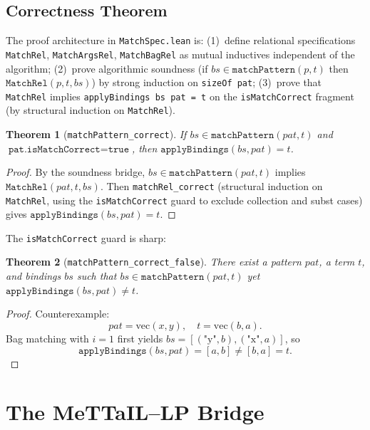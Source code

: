 \documentclass[]{article}
\newtheorem{theorem}{Theorem}
\newcommand{\code}[1]{\texttt{#1}}
\newcommand{\MeTTaIL}{\textup{MeTTaIL}}
\begin{document}
\subsection{Correctness Theorem}

The proof architecture in \code{MatchSpec.lean} is:
(1)~define relational specifications \code{MatchRel}, \code{MatchArgsRel},
\code{MatchBagRel} as mutual inductives independent of the algorithm;
(2)~prove algorithmic soundness (if $bs \in \code{matchPattern}(p, t)$ then
$\code{MatchRel}(p, t, bs)$) by strong induction on \code{sizeOf pat};
(3)~prove that \code{MatchRel} implies \code{applyBindings bs pat = t} on the
\code{isMatchCorrect} fragment (by structural induction on \code{MatchRel}).

\begin{theorem}[\code{matchPattern\_correct}]
\label{thm:matchcorrect}
If $bs \in \code{matchPattern}(pat, t)$ and $\code{pat.isMatchCorrect} = \code{true}$,
then $\code{applyBindings}(bs, pat) = t$.
\end{theorem}

\begin{proof}
By the soundness bridge, $bs \in \code{matchPattern}(pat, t)$ implies
$\code{MatchRel}(pat, t, bs)$.  Then \code{matchRel\_correct} (structural induction
on \code{MatchRel}, using the \code{isMatchCorrect} guard to exclude collection and
subst cases) gives $\code{applyBindings}(bs, pat) = t$.
\end{proof}

The \code{isMatchCorrect} guard is sharp:

\begin{theorem}[\code{matchPattern\_correct\_false}]
There exist a pattern $pat$, a term $t$, and bindings $bs$
such that $bs \in \code{matchPattern}(pat, t)$ yet
$\code{applyBindings}(bs, pat) \neq t$.
\end{theorem}

\begin{proof}
Counterexample:
\[
  pat = \mathrm{vec}(x,y),\quad t = \mathrm{vec}(b,a).
\]
Bag matching with $i = 1$ first yields
$bs = [(\text{"y"}, b), (\text{"x"}, a)]$, so
\[
  \code{applyBindings}(bs, pat) = [a,b] \neq [b,a] = t.
\]
\end{proof}

\section{The \MeTTaIL{}--LP Bridge}
\label{sec:bridge}
\end{document}
